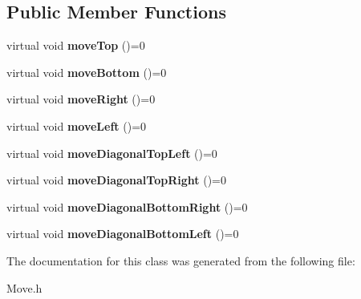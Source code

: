 \subsection*{Public Member Functions}
\begin{DoxyCompactItemize}
\item 
\mbox{\label{class_move_ada092c8b3ab8e9c6824432a04dbad285}} 
virtual void {\bfseries move\+Top} ()=0
\item 
\mbox{\label{class_move_a183afa5e8eb4efb49f30675fd60ccceb}} 
virtual void {\bfseries move\+Bottom} ()=0
\item 
\mbox{\label{class_move_af147ff62b7d9789da1b5d08958a90d39}} 
virtual void {\bfseries move\+Right} ()=0
\item 
\mbox{\label{class_move_aa7cd66ebda7f528c42a864c6a656d7d5}} 
virtual void {\bfseries move\+Left} ()=0
\item 
\mbox{\label{class_move_a3b2c83c3735c10ab11fe809fc0d34b19}} 
virtual void {\bfseries move\+Diagonal\+Top\+Left} ()=0
\item 
\mbox{\label{class_move_a9696ef666d5526fab259215275f66647}} 
virtual void {\bfseries move\+Diagonal\+Top\+Right} ()=0
\item 
\mbox{\label{class_move_ae05211234da445f809c862492abcbce1}} 
virtual void {\bfseries move\+Diagonal\+Bottom\+Right} ()=0
\item 
\mbox{\label{class_move_a8c9bf0880455645406acbbf0d426ea38}} 
virtual void {\bfseries move\+Diagonal\+Bottom\+Left} ()=0
\end{DoxyCompactItemize}


The documentation for this class was generated from the following file\+:\begin{DoxyCompactItemize}
\item 
Move.\+h\end{DoxyCompactItemize}
